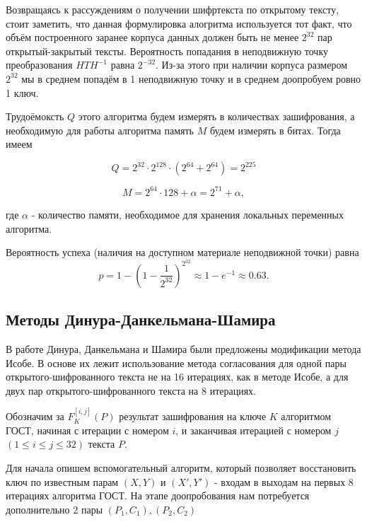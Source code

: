 \documentclass[a4paper,12pt]{article}
\theoremstyle{definition}
\begin{document}
	Возвращаясь к рассуждениям о получении шифртекста по открытому тексту, стоит заметить, что данная формулировка алогритма используется тот факт, что объём построенного заранее корпуса данных должен быть не менее $2^{32}$ пар открытый-закрытый тексты. Вероятность попадания в неподвижную точку преобразования $H T H^{-1}$ равна $2^{-32}$. Из-за этого при наличии корпуса размером $2^{32}$ мы в среднем попадём в 1 неподвижную точку и в среднем доопробуем ровно 1 ключ.
	
	Трудоёмоксть $Q$ этого алгоритма будем измерять в количествах зашифрования, а необходимую для работы алгоритма память $M$ будем измерять в битах. Тогда имеем
	
	\[ Q = 2^{32} \cdot 2^{128} \cdot (2^{64} + 2^{64}) = 2^{225} \]
	
	\[ M = 2^{64} \cdot 128 + \alpha = 2^{71} + \alpha,  \]
		
	где $\alpha$ - количество памяти, необходимое для хранения локальных переменных алгоритма.
	
	Вероятность успеха (наличия на доступном материале неподвижной точки) равна	
	\[ p=1-(1-\frac{1}{2^{32}})^{2^{32}} \approx 1 - e^{-1} \approx 0.63. \]
	
	\subsection*{Методы Динура-Данкельмана-Шамира}
	
	
	В работе Динура, Данкельмана и Шамира были предложены модификации метода Исобе. В основе их лежит использование метода согласования для одной пары открытого-шифрованного текста не на 16 итерациях, как в методе Исобе, а для двух пар открытого-шифрованного текста на 8 итерациях.

		
	Обозначим за $F_K^{[i, j]}(P)$ результат зашифрования на ключе $K$ алгоритмом ГОСТ, начиная с итерации с номером $i$, и заканчивая итерацией с номером $j$ $(1 \le i \le j \le 32)$ текста $P$.
	
	Для начала опишем вспомогательный алгоритм, который позволяет восстановить ключ по известным парам $(X, Y)$ и $(X', Y')$ - входам в выходам на первых 8 итерациях алгоритма ГОСТ. На этапе доопробования нам потребуется дополнительно 2 пары $(P_1, C_1), (P_2, C_2)$
	
\end{document}
